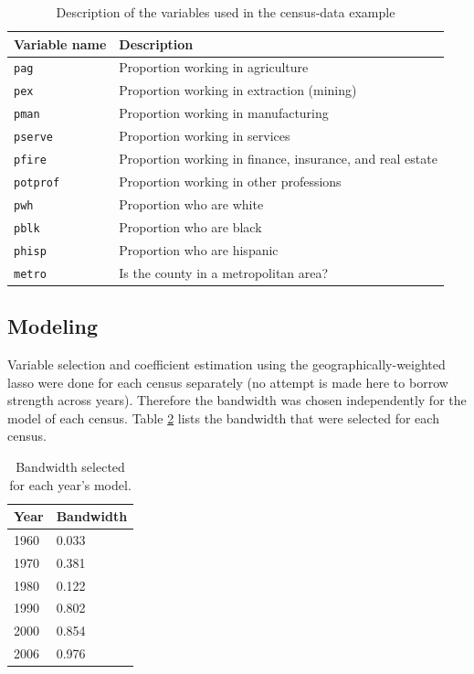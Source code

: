 \documentclass[authoryear, review, 11pt]{elsarticle}
\begin{document}
	\begin{table}
		\begin{center}
		\begin{tabular}{ll}
			Variable name & Description \\
			\hline
			\verb!pag! & Proportion working in agriculture\\
			\verb!pex! &  Proportion working in extraction (mining)\\
			\verb!pman! & Proportion working in manufacturing \\
			\verb!pserve! & Proportion working in services \\
			\verb!pfire! & Proportion working in finance, insurance, and real estate \\
			\verb!potprof! & Proportion working in other professions \\
			\verb!pwh! & Proportion who are white \\
			\verb!pblk! & Proportion who are black \\
			\verb!phisp! & Proportion who are hispanic \\
			\verb!metro! & Is the county in a metropolitan area?\\
		\end{tabular}
		\caption{Description of the variables used in the census-data example\label{table:census-vars}}
		\end{center}		
	\end{table}
	
	\subsection{Modeling}	
	Variable selection and coefficient estimation using the geographically-weighted lasso were done for each census separately (no attempt is made here to borrow strength across years). Therefore the bandwidth was chosen independently for the model of each census. Table \ref{table:census-bandwidth} lists the bandwidth that were selected for each census.
	
	\begin{table}
		\begin{center}
		\begin{tabular}{ll}
			Year & Bandwidth \\
			\hline
			1960 & 0.033\\
			1970 &  0.381\\
			1980 & 0.122\\
			1990 & 0.802\\
			2000 & 0.854\\
			2006 & 0.976\\
		\end{tabular}
		\caption{Bandwidth selected for each year's model.\label{table:census-bandwidth}}
		\end{center}		
	\end{table}
	
\end{document}
